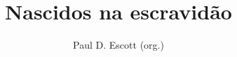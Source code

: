 \documentclass[11pt]{extarticle}
\begin{document}
\newcommand{\AutorLivro}{Paul D. Escott (org.)}
\newcommand{\TituloLivro}{Nascidos na escravidão}
\newcommand{\Tema}{Diálogos com a sociologia e com a antropologia}
\newcommand{\Genero}{Relatos e memórias}
\newcommand{\imagemCapa}{./images/PNLD0007-01.png}
\newcommand{\issnppub}{---}
\newcommand{\issnepub}{---}
\newcommand{\colaborador}{\textbf{Eduardo Modesto de Carvalho, Bruno Gradella e Vicente Castro} é uma pessoa incrível e vai fazer um bom serviço.}


\title{\TituloLivro}
\author{\AutorLivro}
\def\authornotes{\colaborador}

\date{}
\maketitle
\end{document}
